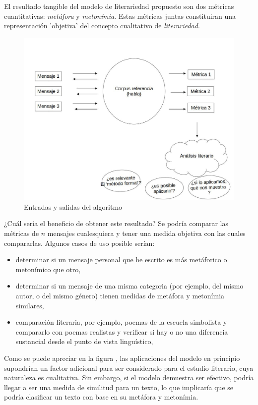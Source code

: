 \documentclass[12pt,letterpaper,twoside]{article}
\begin{document}
El resultado tangible del modelo de literariedad propuesto son dos
métricas cuantitativas: \emph{metáfora} y \emph{metonímia}.  Estas métricas
juntas constituiran una representación 'objetiva' del concepto
cualitativo de \emph{literariedad}.

\begin{figure}[htbp]
\centering
\includegraphics[width=.9\linewidth]{./assets/posibles_usos.jpg}
\caption{\label{fig:posibles_usos}Entradas y salidas del algoritmo}
\end{figure}


¿Cuál sería el beneficio de obtener este resultado? Se podría
comparar las métricas de \(n\) mensajes cualesquiera y tener una
medida objetiva con las cuales compararlas. Algunos casos de uso
posible serían:

\begin{itemize}
\item determinar si un mensaje personal que he escrito es más
metáforico o metonímico que otro,

\item determinar si un mensaje de una misma categoria (por ejemplo,
del mismo autor, o del mismo género) tienen medidas de metáfora
y metonímia similares,

\item comparación literaria, por ejemplo, poemas de la escuela
simbolista y compararlo con poemas realistas y verificar si
hay o no una diferencia sustancial desde el punto de vista
linguístico,
\end{itemize}

Como se puede apreciar en la figura , las aplicaciones
del modelo en principio supondrían un factor adicional para ser
considerado para el estudio literario, cuya naturaleza es
cualitativa. Sin embargo, si el modelo demuestra ser efectivo,
podría llegar a ser una medida de similitud para un texto, lo que
implicaría que se podría clasificar un texto con base en su
metáfora y metonímia.
\end{document}
